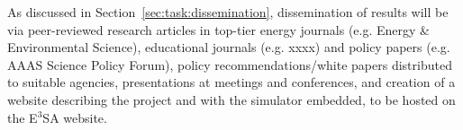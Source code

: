 \documentclass[11pt,a4paper]{article}
\begin{document}
As discussed in Section~\ref{sec:task:dissemination},
dissemination of results will be via 
peer-reviewed research articles in top-tier energy journals 
(e.g. Energy \& Environmental Science),
educational journals (e.g. xxxx) and 
policy papers (e.g. AAAS Science Policy Forum), 
policy recommendations/white papers distributed to suitable agencies, 
presentations at meetings and conferences, and 
creation of a website describing the project
and with the simulator embedded,
to be hosted on the E$^3$SA website.

\newpage





\end{document}
